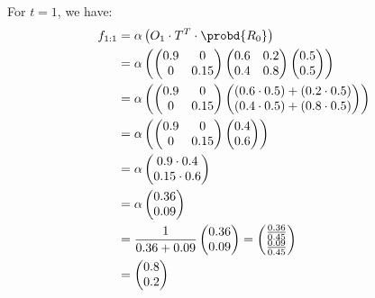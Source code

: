 For $t=1$, we have:
\begin{align*}
f_{1:1} &= \alpha \left( O_1 \cdot T^T \cdot \probd{R_0} \right) \\
&= \alpha \left( 
\begin{pmatrix}
0.9 & 0 \\
0 & 0.15
\end{pmatrix}
\begin{pmatrix}
0.6 & 0.2 \\
0.4 & 0.8
\end{pmatrix}
\begin{pmatrix}
0.5 \\
0.5
\end{pmatrix}
\right) \\
&= \alpha \left( 
\begin{pmatrix}
0.9 & 0 \\
0 & 0.15
\end{pmatrix}
\begin{pmatrix}
(0.6 \cdot 0.5) + (0.2 \cdot 0.5) \\
(0.4 \cdot 0.5) + (0.8 \cdot 0.5)
\end{pmatrix}
\right) \\
&= \alpha \left( 
\begin{pmatrix}
0.9 & 0 \\
0 & 0.15
\end{pmatrix}
\begin{pmatrix}
0.4 \\
0.6
\end{pmatrix}
\right) \\
&= \alpha 
\begin{pmatrix}
0.9 \cdot 0.4 \\
0.15 \cdot 0.6
\end{pmatrix} \\
&= \alpha 
\begin{pmatrix}
0.36 \\
0.09
\end{pmatrix} \\
&= \frac{1}{0.36 + 0.09} \begin{pmatrix} 0.36 \\ 0.09 \end{pmatrix} = \begin{pmatrix} \frac{0.36}{0.45} \\ \frac{0.09}{0.45} \end{pmatrix} \\
&= \begin{pmatrix} 0.8 \\ 0.2 \end{pmatrix}
\end{align*}

